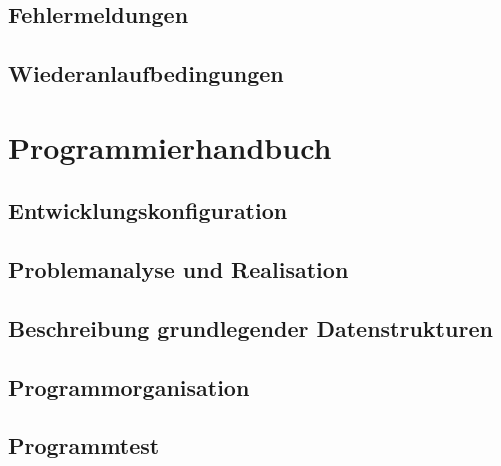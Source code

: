\documentclass[a4paper,10pt]{scrreprt}
\begin{document}
\section{Fehlermeldungen}
\label{sec:fehlermeldungen}

\section{Wiederanlaufbedingungen}
\label{sec:wiederanlaufbedingungen}

\chapter{Programmierhandbuch}
\label{chap:Programmierhandbuch}

\section{Entwicklungskonfiguration}
\label{sec:entwicklungskonfiguration}

\section{Problemanalyse und Realisation}
\label{sec:problemanalyse-und-realisation}

\section{Beschreibung grundlegender Datenstrukturen}
\label{sec:beschreibung-grundlegender-datenstrukturen}

\section{Programmorganisation}
\label{sec:programmorganisation}

\section{Programmtest}
\label{sec:programmtest}
\end{document}
